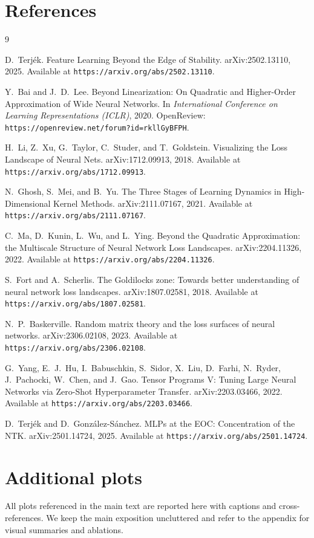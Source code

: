 \documentclass[12pt]{article}
\begin{document}
\section*{References}
\begin{thebibliography}{9}

D.~Terj\'ek.
\newblock Feature Learning Beyond the Edge of Stability.
\newblock arXiv:2502.13110, 2025.
\newblock Available at \texttt{https://arxiv.org/abs/2502.13110}.

Y.~Bai and J.~D.~Lee.
\newblock Beyond Linearization: On Quadratic and Higher-Order Approximation of Wide Neural Networks.
\newblock In \emph{International Conference on Learning Representations (ICLR)}, 2020.
\newblock OpenReview: \texttt{https://openreview.net/forum?id=rkllGyBFPH}.

H.~Li, Z.~Xu, G.~Taylor, C.~Studer, and T.~Goldstein.
\newblock Visualizing the Loss Landscape of Neural Nets.
\newblock arXiv:1712.09913, 2018.
\newblock Available at \texttt{https://arxiv.org/abs/1712.09913}.

N.~Ghosh, S.~Mei, and B.~Yu.
\newblock The Three Stages of Learning Dynamics in High-Dimensional Kernel Methods.
\newblock arXiv:2111.07167, 2021.
\newblock Available at \texttt{https://arxiv.org/abs/2111.07167}.

C.~Ma, D.~Kunin, L.~Wu, and L.~Ying.
\newblock Beyond the Quadratic Approximation: the Multiscale Structure of Neural Network Loss Landscapes.
\newblock arXiv:2204.11326, 2022.
\newblock Available at \texttt{https://arxiv.org/abs/2204.11326}.

S.~Fort and A.~Scherlis.
\newblock The Goldilocks zone: Towards better understanding of neural network loss landscapes.
\newblock arXiv:1807.02581, 2018.
\newblock Available at \texttt{https://arxiv.org/abs/1807.02581}.

N.~P.~Baskerville.
\newblock Random matrix theory and the loss surfaces of neural networks.
\newblock arXiv:2306.02108, 2023.
\newblock Available at \texttt{https://arxiv.org/abs/2306.02108}.

G.~Yang, E.~J.~Hu, I.~Babuschkin, S.~Sidor, X.~Liu, D.~Farhi, N.~Ryder, J.~Pachocki, W.~Chen, and J.~Gao.
\newblock Tensor Programs V: Tuning Large Neural Networks via Zero-Shot Hyperparameter Transfer.
\newblock arXiv:2203.03466, 2022.
\newblock Available at \texttt{https://arxiv.org/abs/2203.03466}.

D.~Terj\'ek and D.~Gonz\'alez-S\'anchez.
\newblock MLPs at the EOC: Concentration of the NTK.
\newblock arXiv:2501.14724, 2025.
\newblock Available at \texttt{https://arxiv.org/abs/2501.14724}.

\end{thebibliography}

\appendix
\section{Additional plots}\label{app:plots}
All plots referenced in the main text are reported here with captions and cross-references. We keep the main exposition uncluttered and refer to the appendix for visual summaries and ablations.
\end{document}
